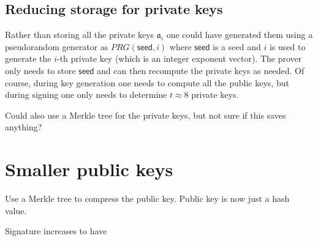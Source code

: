 \documentclass{llncs}
\newcommand{\seed}{\textsf{seed}}
\renewcommand{\a}{\mathfrak{a}}
\begin{document}
\subsection{Reducing storage for private keys}

Rather than storing all the private keys $\a_i$ one could have generated them using a pseudorandom generator as $PRG( \seed, i )$ where $\seed$ is a seed and $i$ is used to generate the $i$-th private key (which is an integer exponent vector).
The prover only needs to store $\seed$ and can then recompute the private keys as needed.
Of course, during key generation one needs to compute all the public keys, but during signing one only needs to determine $t \approx 8$ private keys.

Could also use a Merkle tree for the private keys, but not sure if this saves anything?



\section{Smaller public keys}

Use a Merkle tree to compress the public key.
Public key is now just a hash value.

Signature increases to have 




\end{document}

